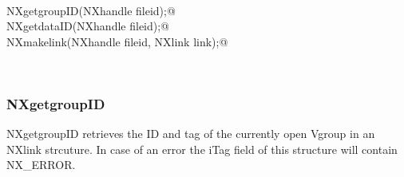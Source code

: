 \documentclass[12pt]{article}
\begin{document}
\begin{flushleft} \small
\begin{minipage}{\linewidth} \label{scrap23}
\vspace{-1ex}
\begin{list}{}{} \item
\mbox{}\verb@@\\
\mbox{}\verb@NXlink      NXgetgroupID(NXhandle fileid);@\\
\mbox{}\verb@NXlink      NXgetdataID(NXhandle fileid);@\\
\mbox{}\verb@NXstatus    NXmakelink(NXhandle fileid, NXlink link);@\\
\end{list}
\vspace{-1ex}
\footnotesize\addtolength{\baselineskip}{-1ex}
\end{minipage}\\[4ex]
\end{flushleft}
\subsubsection{  NXgetgroupID}
NXgetgroupID retrieves the ID and tag of the currently open
Vgroup in an NXlink strcuture. In case of an error the iTag field of this
structure will contain NX\_ERROR.
\end{document}
